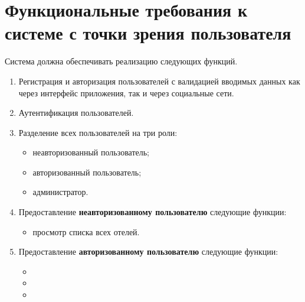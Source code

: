 \section*{Функциональные требования к системе с точки зрения пользователя}
Система должна обеспечивать реализацию следующих функций.
\begin{enumerate}
	\item Регистрация и авторизация пользователей с валидацией вводимых данных как через интерфейс приложения, так и через	социальные сети.
	
	\item Аутентификация пользователей.
	
	\item Разделение всех пользователей на три роли:
	\begin{itemize}
		\item неавторизованный пользователь;
		
		\item авторизованный пользователь;
		
		\item администратор.
	\end{itemize}
	
	\item Предоставление \textbf{неавторизованному пользователю} следующие функции:
	\begin{itemize}
		\item просмотр списка всех отелей.
	\end{itemize}
	
	\item Предоставление \textbf{авторизованному пользователю} следующие функции:
	\begin{itemize}
		\item 
		
		\item 
		
		\item 
	\end{itemize}

	
\end{enumerate}


 

\pagebreak